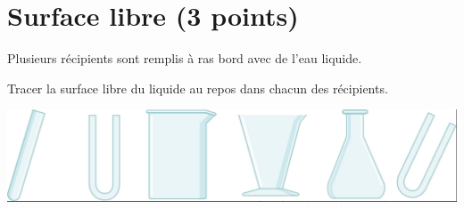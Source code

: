 \section{Surface libre (3 points)}\label{ex:surface}

Plusieurs récipients sont remplis à ras bord avec de l'eau liquide.


\begin{questions}
	
			
		\question[3] Tracer la surface libre du liquide au repos dans chacun des récipients.
		
		\begin{center}
			\includegraphics[scale=0.4]{img/surface}
		\end{center}	
\end{questions}
